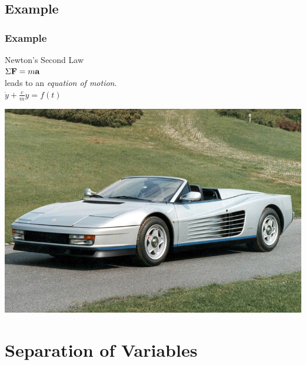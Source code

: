 \documentclass[fleqn]{beamer} %
\newcommand{\sectionIItitle}{Separation of Variables}
\newcommand{\sectionIsubsectionIIItitle}{Example}
\begin{document}
		\subsection{\sectionIsubsectionIIItitle}\label{sectionIsubsectionIII}
			\begin{frame} 
				\frametitle{\sectionIsubsectionIIItitle}
				\bigskip

				\begin{multicols}{2}

					Newton's Second Law \vspace{2mm}\\

					$\Sigma {\bf F}=m {\bf a}$ \vspace{2mm}\\

					leads  to an {\it equation of motion}.  \vspace{2mm}\\

					$\dot{y}+\frac{c}{m}y=f(t)$

					\includegraphics[scale=0.15]{images/ferrari.jpg}\\
				 
				\end{multicols} 	
				
				\btVFill
			\end{frame}	

	
	\section{\sectionIItitle}\label{sectionII}
\end{document}
